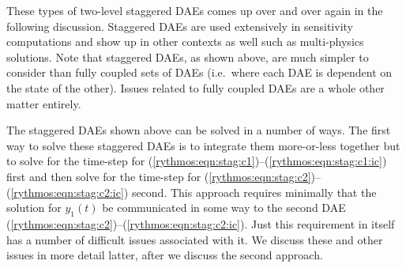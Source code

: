 \documentclass[pdf,ps2pdf,11pt]{SANDreport}
\begin{document}
These types of two-level staggered DAEs comes up over and over again in the
following discussion.  Staggered DAEs are used extensively in sensitivity
computations and show up in other contexts as well such as multi-physics
solutions.  Note that staggered DAEs, as shown above, are much simpler to
consider than fully coupled sets of DAEs (i.e.\ where each DAE is dependent on
the state of the other).  Issues related to fully coupled DAEs are a whole
other matter entirely.

The staggered DAEs shown above can be solved in a number of ways.  The first
way to solve these staggered DAEs is to integrate them more-or-less together
but to solve for the time-step for
(\ref{rythmos:eqn:stag:c1})--(\ref{rythmos:eqn:stag:c1:ic}) first and then
solve for the time-step for
(\ref{rythmos:eqn:stag:c2})--(\ref{rythmos:eqn:stag:c2:ic}) second.  This
approach requires minimally that the solution for $y_1(t)$ be communicated in
some way to the second DAE
(\ref{rythmos:eqn:stag:c2})--(\ref{rythmos:eqn:stag:c2:ic}).  Just this
requirement in itself has a number of difficult issues associated with it.  We
discuss these and other issues in more detail latter, after we discuss the
second approach.
\end{document}
